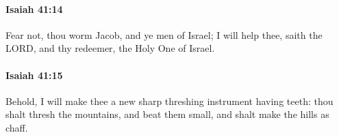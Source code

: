 		\paragraph{Isaiah 41:14} %
			\label{ISAIAH-41-14}

			Fear not, thou worm Jacob, and ye men of Israel; I will help thee, saith the LORD, and thy redeemer, the Holy One of Israel.


		\paragraph{Isaiah 41:15} %
			\label{ISAIAH-41-15}

			Behold, I will make thee a new sharp threshing instrument having teeth: thou shalt thresh the mountains, and beat them small, and shalt make the hills as chaff.


